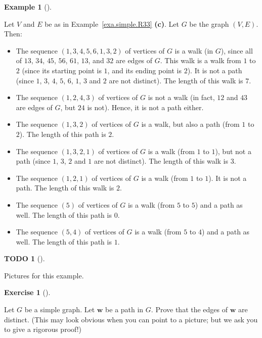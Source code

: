 \documentclass[numbers=enddot,12pt,final,onecolumn,notitlepage]{scrartcl}%
\theoremstyle{definition}
\newtheorem{exam}[theo]{Example}
\newenvironment{example}[1][]
{\begin{exam}[#1]\begin{leftbar}}
{\end{leftbar}\end{exam}}
\newtheorem{exmp}[theo]{Exercise}
\newenvironment{exercise}[1][]
{\begin{exmp}[#1]\begin{leftbar}}
{\end{leftbar}\end{exmp}}
\newtheorem{quest}[theo]{TODO}
\newenvironment{todo}[1][]
{\begin{quest}[#1]\begin{leftbar}}
{\end{leftbar}\end{quest}}
\newcommand{\tup}[1]{\left( #1 \right)}
\begin{document}
\begin{example} \label{exa.intro.walks}
Let $V$ and $E$ be as in Example~\ref{exa.simple.R33} \textbf{(c)}.
Let $G$ be the graph $\tup{V, E}$. Then:

\begin{itemize}
\item The sequence $\tup{1, 3, 4, 5, 6, 1, 3, 2}$ of vertices of $G$
is a walk (in $G$), since all of $13$, $34$, $45$, $56$, $61$, $13$,
and $32$ are edges of $G$. This walk is a walk from $1$ to $2$ (since
its starting point is $1$, and its ending point is $2$). It is not a
path (since $1$, $3$, $4$, $5$, $6$, $1$, $3$ and $2$ are not
distinct). The length of this walk is $7$.

\item The sequence $\tup{1, 2, 4, 3}$ of vertices of $G$ is not a walk
(in fact, $12$ and $43$ are edges of $G$, but $24$ is not). Hence, it
is not a path either.

\item The sequence $\tup{1, 3, 2}$ of vertices of $G$ is a walk, but
also a path (from $1$ to $2$). The length of this path is $2$.

\item The sequence $\tup{1, 3, 2, 1}$ of vertices of $G$ is a walk
(from $1$ to $1$), but not a path (since $1$, $3$, $2$ and $1$ are
not distinct). The length of this walk is $3$.

\item The sequence $\tup{1, 2, 1}$ of vertices of $G$ is a walk
(from $1$ to $1$). It is not a path. The length of this walk is $2$.

\item The sequence $\tup{5}$ of vertices of $G$ is a walk (from $5$
to $5$) and a path as well. The length of this path is $0$.

\item The sequence $\tup{5, 4}$ of vertices of $G$ is a walk (from $5$
to $4$) and a path as well. The length of this path is $1$.
\end{itemize}
\end{example}

\begin{todo}
Pictures for this example.
\end{todo}

\begin{exercise} \label{exe.intro.path.edges-dist}
Let $G$ be a simple graph. Let $\mathbf{w}$ be a path in $G$.
Prove that the edges of $\mathbf{w}$ are distinct. (This may look
obvious when you can point to a picture; but we ask you to give a
rigorous proof!)
\end{exercise}
\end{document}
